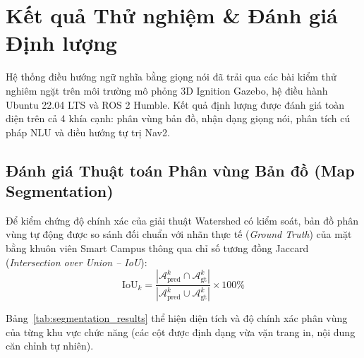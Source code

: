 \section{Kết quả Thử nghiệm & Đánh giá Định lượng}
\label{sec:results}

Hệ thống điều hướng ngữ nghĩa bằng giọng nói đã trải qua các bài kiểm thử nghiêm ngặt trên môi trường mô phỏng 3D Ignition Gazebo, hệ điều hành Ubuntu 22.04 LTS và ROS 2 Humble. Kết quả định lượng được đánh giá toàn diện trên cả 4 khía cạnh: phân vùng bản đồ, nhận dạng giọng nói, phân tích cú pháp NLU và điều hướng tự trị Nav2.

\subsection{Đánh giá Thuật toán Phân vùng Bản đồ (Map Segmentation)}

Để kiểm chứng độ chính xác của giải thuật Watershed có kiểm soát, bản đồ phân vùng tự động được so sánh đối chuẩn với nhãn thực tế (\textit{Ground Truth}) của mặt bằng khuôn viên Smart Campus thông qua chỉ số tương đồng Jaccard (\textit{Intersection over Union -- IoU}):
\begin{equation}
\text{IoU}_k = \frac{|\mathcal{A}_{\text{pred}}^k \cap \mathcal{A}_{\text{gt}}^k|}{|\mathcal{A}_{\text{pred}}^k \cup \mathcal{A}_{\text{gt}}^k|} \times 100\%
\end{equation}

Bảng~\ref{tab:segmentation_results} thể hiện diện tích và độ chính xác phân vùng của từng khu vực chức năng (các cột được định dạng vừa vặn trang in, nội dung căn chỉnh tự nhiên).

